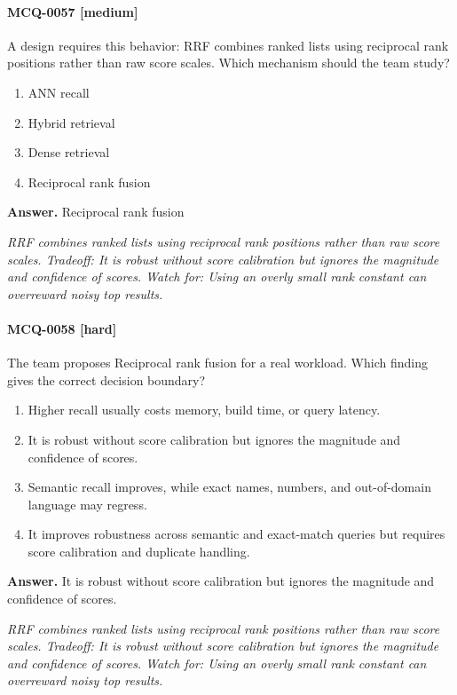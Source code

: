 \paragraph{MCQ-0057 [medium]} A design requires this behavior: RRF combines ranked lists using reciprocal rank positions rather than raw score scales. Which mechanism should the team study?
\begin{enumerate}[label=\Alph*.]
\item ANN recall
\item Hybrid retrieval
\item Dense retrieval
\item Reciprocal rank fusion
\end{enumerate}
\noindent\textbf{Answer.} Reciprocal rank fusion
\par\textit{RRF combines ranked lists using reciprocal rank positions rather than raw score scales. Tradeoff: It is robust without score calibration but ignores the magnitude and confidence of scores. Watch for: Using an overly small rank constant can overreward noisy top results.}
\paragraph{MCQ-0058 [hard]} The team proposes Reciprocal rank fusion for a real workload. Which finding gives the correct decision boundary?
\begin{enumerate}[label=\Alph*.]
\item Higher recall usually costs memory, build time, or query latency.
\item It is robust without score calibration but ignores the magnitude and confidence of scores.
\item Semantic recall improves, while exact names, numbers, and out-of-domain language may regress.
\item It improves robustness across semantic and exact-match queries but requires score calibration and duplicate handling.
\end{enumerate}
\noindent\textbf{Answer.} It is robust without score calibration but ignores the magnitude and confidence of scores.
\par\textit{RRF combines ranked lists using reciprocal rank positions rather than raw score scales. Tradeoff: It is robust without score calibration but ignores the magnitude and confidence of scores. Watch for: Using an overly small rank constant can overreward noisy top results.}
